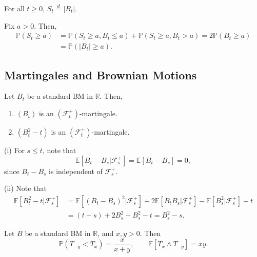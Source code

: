 \documentclass[12pt]{article}
\begin{document}
\begin{corollary}
	For all $t \geq 0$, $S_t \overset d= |B_t|$.
\end{corollary}

\begin{proofbox}
	Fix $a > 0$. Then,
	\begin{align*}
		\mathbb{P}(S_t \geq a) &= \mathbb{P}(S_t \geq a, B_t \leq a) + \mathbb{P}(S_t \geq a, B_t > a) = 2 \mathbb{P}(B_t \geq a) \\
				       &= \mathbb{P}(|B_t| \geq a).
	\end{align*}
\end{proofbox}

\subsection{Martingales and Brownian Motions}%
\label{sub:mgbm}

\begin{proposition}
	Let $B_t$ be a standard BM in $\mathbb{R}$. Then,
	\begin{enumerate}[\normalfont(i)]
		\item $(B_t)$ is an $(\mathcal{F}_t^+)$-martingale.
		\item $(B_t^2 - t)$ is an $(\mathcal{F}_t^+)$-martingale.
	\end{enumerate}
\end{proposition}

\begin{proofbox}
	

	(i) For $s \leq t$, note that
	\[
	\mathbb{E}[B_t - B_s | \mathcal{F}_s^+] = \mathbb{E}[B_t - B_s] = 0,
	\]
	since $B_t - B_s$ is independent of $\mathcal{F}_s^+$.
	
	(ii) Note that
	\begin{align*}
		\mathbb{E}[B_t^2 - t | \mathcal{F}_s^+] &= \mathbb{E}[(B_t - B_s)^2 | \mathcal{F}_s^+] + 2 \mathbb{E}[B_t B_s | \mathcal{F}_s^+] - \mathbb{E}[B_s^2 | \mathcal{F}_s^+] - t \\
							&= (t - s) + 2 B_s^2 - B_s^2 - t = B_s^2 - s.
	\end{align*}
\end{proofbox}

\begin{proposition}
	Let $B$ be a standard BM in $\mathbb{R}$, and $x, y > 0$. Then
	\[
	\mathbb{P}(T_{-y} < T_x) = \frac{x}{x + y}, \qquad \mathbb{E}[T_x \wedge T_{-y}] = xy.
	\]
\end{proposition}
\end{document}
